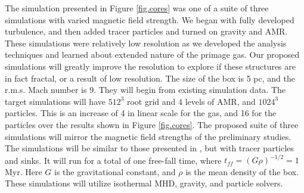 The simulation presented in Figure \ref{fig.cores} was one of a suite of three
simulations with varied magnetic field strength.  We began with fully developed
turbulence, and then added tracer particles and turned on gravity and AMR.  These simulations were
relatively low resolution as we developed the analysis techniques and learned
about extended nature of the primage gas.
Our proposed simulations will greatly improve the resolution
to explore if these structures are in fact fractal, or a result of low
resolution. The size of the box is 5 pc, and the r.m.s. Mach number is 9.  They
will begin from existing simulation data.  The target simulations will have $512^3$ root grid and 4 levels of
AMR, and $1024^3$ particles.  This is an increase of 4 in linear scale for the
gas, and 16 for the particles over the results shown in Figure \ref{fig.cores}.
The proposed suite of three simulations will mirror the magnetic field strengths
of the preliminary studies.  The simulations will be similar to those presented
in \citep{Collins12}, but with tracer particles and sinks.
It will run for a total of one free-fall time, where $t_{ff}=(G
\rho)^{-1/2}=1$Myr.  Here
$G$ is the gravitational constant, and $\rho$ is the mean density of the box.
These simulations will utilize isothermal MHD, gravity, and particle solvers.

